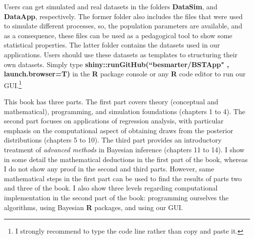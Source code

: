 Users can get simulated and real datasets in the folders \textbf{DataSim}, and \textbf{DataApp}, respectively. The former folder also includes the files that were used to simulate different processes, so, the population parameters are available, and as a consequence, these files can be used as a pedagogical tool to show some statistical properties. The latter folder contains the datasets used in our applications. Users should use these datasets as templates to structuring their own datasets. Simply type \textbf{shiny::runGitHub(``besmarter/BSTApp" , launch.browser=T)} in the \textbf{R} package console or any \textbf{R} code editor to run our GUI.\footnote{I strongly recommend to type the code line rather than copy and paste it.}

This book has three parts. The first part covers theory (conceptual and mathematical), programming, and simulation foundations (chapters 1 to 4). The second part focuses on applications of regression analysis, with particular emphasis on the computational aspect of obtaining draws from the posterior distributions (chapters 5 to 10). The third part provides an introductory treatment of \textit{advanced methods} in Bayesian inference (chapters 11 to 14). I show in some detail the mathematical deductions in the first part of the book, whereas I do not show any proof in the second and third parts. However, same mathematical steps in the first part can be used to find the results of parts two and three of the book. I also show three levels regarding computational implementation in the second part of the book: programming ourselves the algorithms, using Bayesian \textbf{R} packages, and using our GUI. 

